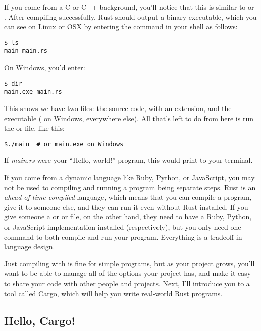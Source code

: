 If you come from a C or C++ background, you'll notice that this is similar to  or . After 
compiling successfully, Rust should output a binary executable, which you can see on Linux or OSX by entering the 
 command in your shell as follows:

\begin{verbatim}
$ ls
main main.rs 
\end{verbatim}

On Windows, you'd enter:

\begin{verbatim}
$ dir
main.exe main.rs  
\end{verbatim}

This shows we have two files: the source code, with an  extension, and the executable ( on Windows, 
 everywhere else). All that's left to do from here is run the  or  file, like this:

\begin{verbatim}
$./main  # or main.exe on Windows  
\end{verbatim}

If \emph{main.rs} were your \enquote{Hello, world!} program, this would print  to your terminal.

\blank

If you come from a dynamic language like Ruby, Python, or JavaScript, you may not be used to compiling and running a program 
being separate steps. Rust is an \emph{ahead-of-time compiled} language, which means that you can compile a program, give it 
to someone else, and they can run it even without Rust installed. If you give someone a  or  or  
file, on the other hand, they need to have a Ruby, Python, or JavaScript implementation installed (respectively), but you only 
need one command to both compile and run your program. Everything is a tradeoff in language design.

\blank

Just compiling with  is fine for simple programs, but as your project grows, you'll want to be able to manage all 
of the options your project has, and make it easy to share your code with other people and projects. Next, I'll introduce you 
to a tool called Cargo, which will help you write real-world Rust programs.

\subsection{Hello, Cargo!}

